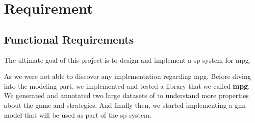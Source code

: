 \section{Requirement}
\subsection{Functional Requirements}
The ultimate goal of this project is to design and implement a \acrshort{sp} system for \acrshort{mpg}. 

As we were not able to discover any implementation regarding \acrshort{mpg}. Before diving into the modeling part, we implemented and tested a library that we called \textbf{\acrshort{mpg}}. We generated and annotated two large datasets of  to understand more properties about the game and strategies. And finally then, we started implementing a \acrshort{gnn} model that will be used as part of the \acrshort{sp} system.

